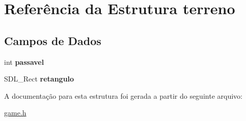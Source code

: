 \hypertarget{structterreno}{
\section{Referência da Estrutura terreno}
\label{structterreno}
}
\subsection*{Campos de Dados}
\begin{DoxyCompactItemize}
\item 
\hypertarget{structterreno_af4541a0087b5e63cdca818a994d5119c}{
int {\bfseries passavel}}
\label{structterreno_af4541a0087b5e63cdca818a994d5119c}

\item 
\hypertarget{structterreno_a66706353d918fc22d4b7130ef5a9fbc4}{
SDL\_\-Rect {\bfseries retangulo}}
\label{structterreno_a66706353d918fc22d4b7130ef5a9fbc4}

\end{DoxyCompactItemize}


A documentação para esta estrutura foi gerada a partir do seguinte arquivo:\begin{DoxyCompactItemize}
\item 
\hyperlink{game_8h}{game.h}\end{DoxyCompactItemize}
